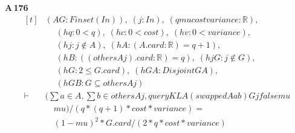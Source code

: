 \noindent\textbf{A\,176}\quad{}
{\footnotesize\[ \begin{aligned}[t]
&(\mathit{A} \mathit{G} : \mathit{Finset} (\mathit{I} \mathit{n})),\; (\mathit{j} : \mathit{I} \mathit{n}),\; (\mathit{q} \mathit{mu} \mathit{cost} \mathit{variance} : \mathbb{R} ),\\
&\quad \; (\mathit{hq} : 0<\mathit{q}),\; (\mathit{hc} : 0<\mathit{cost}),\; (\mathit{hv} : 0<\mathit{variance}),\\
&\quad \; (\mathit{hj} : \mathit{j} \notin \mathit{A}),\; (\mathit{hA} : (\mathit{A}.\mathit{card}:\mathbb{R} )=\mathit{q}+1),\\
&\quad \; (\mathit{hB} : ((\mathit{others} \mathit{A} \mathit{j}).\mathit{card}:\mathbb{R} )=\mathit{q}),\; (\mathit{hjG} : \mathit{j} \notin \mathit{G}),\\
&\quad \; (\mathit{hG} : 2 \leq \mathit{G}.\mathit{card}),\; (\mathit{hGA} : \mathit{Disjoint} \mathit{G} \mathit{A}),\\
&\quad \; (\mathit{hGB} : \mathit{G} \subseteq \mathit{others} \mathit{A} \mathit{j})\\
\vdash\;&(\textstyle\sum \mathit{a} \in \mathit{A},\textstyle\sum \mathit{b} \in \mathit{others} \mathit{A} \mathit{j},\mathit{queryKL} \mathit{A} (\mathit{swapped} \mathit{A} \mathit{a} \mathit{b}) \mathit{G} \mathit{j} \mathit{false} \mathit{mu}\\
&\quad \mathit{mu})/ (\mathit{q}*(\mathit{q}+1)*\mathit{cost}*\mathit{variance}) =\\
&\quad (1-\mathit{mu})^{2}*\mathit{G}.\mathit{card}/(2*\mathit{q}*\mathit{cost}*\mathit{variance})
\end{aligned} \]}

